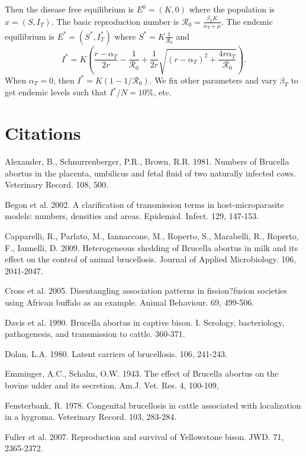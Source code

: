 \documentclass[letterpaper,12pt]{article}
\begin{document}
Then the disease free equilibrium is $E^0=(K,0)$ where the population is $x=(S,I_T)$. The basic reproduction number is $\mathcal{R}_0=\frac{\beta_T K}{\alpha_T + \mu}$. The endemic equilibrium is $E^*=(S^*,I_T^*)$ where $S^*=K\frac{1}{\mathcal{R}_0}$ and 
\begin{equation*}
I^*=K\left( \frac{r-\alpha_T}{2r}-\frac{1}{\mathcal{R}_0} + \frac{1}{2r}\sqrt{(r-\alpha_T)^2 + \frac{4r\alpha_T}{\mathcal{R}_0}}\right).
\end{equation*}
When $\alpha_T=0$, then $I^*=K(1-1/\mathcal{R}_0)$. We fix other parameters and vary $\beta_T$ to get endemic levels such that $I^*/N=10\%$, etc.
\pagebreak



\section*{Citations}

Alexander, B., Schnurrenberger, P.R., Brown, R.R. 1981. Numbers of Brucella abortus in the placenta, umbilicus and fetal fluid of two naturally infected cows. Veterinary Record. 108, 500. 

Begon et al. 2002. A clarification of transmission terms in host-microparasite models: numbers, densities and areas. Epidemiol. Infect. 129, 147-153.

Capparelli, R., Parlato, M., Iannaccone, M., Roperto, S., Marabelli, R., Roperto, F., Iannelli, D. 2009. Heterogeneous shedding of Brucella abortus in milk and its effect on the control of animal brucellosis. Journal of Applied Microbiology. 106, 2041-2047.

Cross et al. 2005. Disentangling association patterns in fission?fusion societies using African buffalo as an example. Animal Behaviour. 69, 499-506.

Davis et al. 1990. Brucella abortus in captive bison. I. Serology, bacteriology, pathogenesis, and transmission to cattle. 360-371.

Dolan, L.A. 1980. Latent carriers of brucellosis. 106, 241-243. 

Emminger, A.C., Schalm, O.W. 1943. The effect of Brucella abortus on the bovine udder and its secretion. Am.J. Vet. Res. 4, 100-109, 

Fensterbank, R. 1978. Congenital brucellosis in cattle associated with localization in a hygroma. Veterinary Record. 103, 283-284.

Fuller et al. 2007. Reproduction and survival of Yellowstone bison. JWD. 71, 2365-2372.
\end{document}
